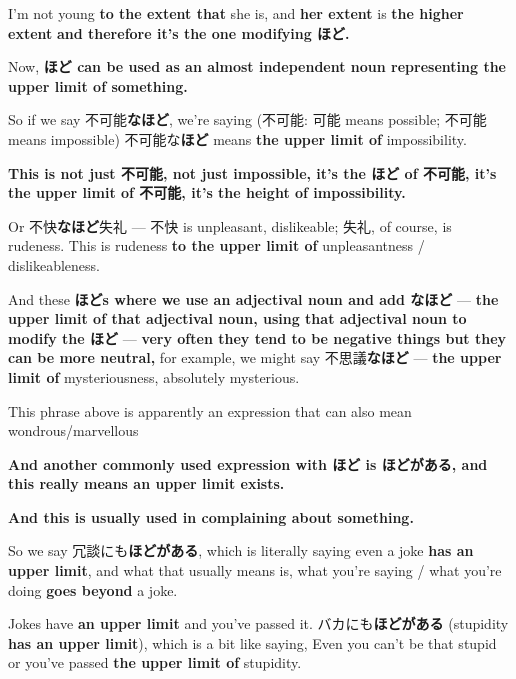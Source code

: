 {}

I'm not young {\bf to the extent that} she is, and {\bf her extent} is {\bf the higher extent} {\bf and therefore it's the one modifying ほど.}

\startsectionlevel[title={ほど as a noun},reference={ほど-as-a-noun}]

Now, {\bf ほど can be used as an almost independent noun representing the upper limit of something.}

So if we say 不可能{\bf なほど}, we're saying (不可能: 可能 means possible; 不可能 means impossible) 不可能な{\bf ほど} means {\bf the upper limit of} impossibility.

{\bf This is not just 不可能, not just impossible, it's the ほど of 不可能, it's the upper limit of 不可能, it's the height of impossibility.}

{}

Or 不快{\bf なほど}失礼 --- 不快 is unpleasant, dislikeable; 失礼, of course, is rudeness. This is rudeness {\bf to the upper limit of} unpleasantness / dislikeableness.

\thinrule

And these {\bf ほどs where we use an adjectival noun and add なほど} --- {\bf the upper limit of that adjectival noun, using that adjectival noun to modify the ほど} --- {\bf very often they tend to be negative things but they can be more neutral,} for example, we might say 不思議{\bf なほど} --- {\bf the upper limit of} mysteriousness, absolutely mysterious.

This phrase above is apparently an expression that can also mean wondrous/marvellous

{\bf And another commonly used expression with ほど is ほどがある, and this really means an upper limit exists.}

{\bf And this is usually used in complaining about something.}

So we say 冗談にも{\bf ほどがある}, which is literally saying even a joke {\bf has an upper limit}, and what that usually means is, what you're saying / what you're doing {\bf goes beyond} a joke.

{}

{}

Jokes have {\bf an upper limit} and you've passed it. バカにも{\bf ほどがある} (stupidity {\bf has an upper limit}), which is a bit like saying, Even you can't be that stupid or you've passed {\bf the upper limit of} stupidity.

